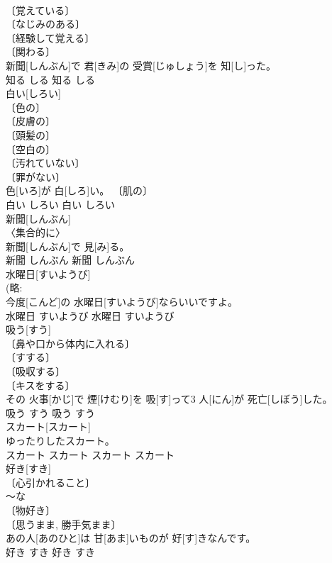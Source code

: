 \documentclass[8pt]{extreport}
\begin{document}
\begin{CJK}{UTF8}{min}
\\	〔覚えている〕 
\\	〔なじみのある〕 
\\	〔経験して覚える〕 
\\	〔関わる〕 
\\	新聞[しんぶん]で 君[きみ]の 受賞[じゅしょう]を 知[し]った。	
\\	知る	しる	知る	しる	
\\	白い[しろい]	
\\	〔色の〕 
\\	〔皮膚の〕 
\\	〔頭髪の〕 
\\	〔空白の〕 
\\	〔汚れていない〕 
\\	〔罪がない〕 
\\	色[いろ]が 白[しろ]い。	〔肌の〕 
\\	白い	しろい	白い	しろい	
\\	新聞[しんぶん]	
\\	〈集合的に〉 
\\	新聞[しんぶん]で 見[み]る。	
\\	新聞	しんぶん	新聞	しんぶん	
\\	水曜日[すいようび]	
\\	(略: 
\\	今度[こんど]の 水曜日[すいようび]ならいいですよ。	
\\	水曜日	すいようび	水曜日	すいようび	
\\	吸う[すう]	
\\	〔鼻や口から体内に入れる〕 
\\	〔すする〕 
\\	〔吸収する〕 
\\	〔キスをする〕 
\\	その 火事[かじ]で 煙[けむり]を 吸[す]って3 人[にん]が 死亡[しぼう]した。	
\\	吸う	すう	吸う	すう	
\\	スカート[スカート]	
\\	ゆったりしたスカート。	
\\	スカート	スカート	スカート	スカート	
\\	好き[すき]	
\\	〔心引かれること〕 
\\	～な 
\\	〔物好き〕 
\\	〔思うまま, 勝手気まま〕 
\\	あの人[あのひと]は 甘[あま]いものが 好[す]きなんです。	
\\	好き	すき	好き	すき	

\end{CJK}
\end{document}
